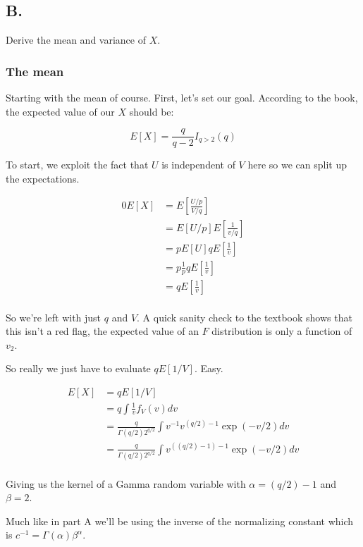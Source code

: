 \subsection*{B.}

Derive the mean and variance of $X$.

\subsubsection*{The mean}

Starting with the mean of course. First, let's set our goal. According to the book, the expected value of our $X$ should be:

$$E[X] = \frac{q}{q-2} I_{q > 2}(q)$$

To start, we exploit the fact that $U$ is independent of $V$ here so we can split up the expectations.

\vspace{-0.4cm}
\begin{align*}0
	E[X] &= E\left[ \frac{U/p}{V/q} \right] \\
	&= E[U/p] E\left[ \frac{1}{v/q} \right] \\
	&= pE[U] qE\left[ \frac{1}{v} \right] \\
	&= p\frac{1}{p}qE\left[ \frac{1}{v} \right] \\
	&= qE\left[ \frac{1}{v} \right] \\
\end{align*}

So we're left with just $q$ and $V$. A quick sanity check to the textbook shows that this isn't a red flag, the expected value of an $F$ distribution is only a function of $v_2$. 

So really we just have to evaluate $qE[1/V]$. Easy.

\begin{align*}
	E[X] &= qE[1/V] \\
	&= q \int \frac{1}{v} f_V(v) dv \\
	&= \frac{q}{\Gamma(q/2) 2^{q/2}} \int v^{-1} v^{(q/2)-1} \exp(-v/2) dv \\
	&= \frac{q}{\Gamma(q/2) 2^{q/2}} \int v^{((q/2) -1 )-1} \exp(-v/2) dv \\
\end{align*}

Giving us the kernel of a Gamma random variable with $\alpha = (q/2)-1$ and $\beta = 2$.

Much like in part A we'll be using the inverse of the normalizing constant which is $c^{-1} = \Gamma(\alpha)\beta^{\alpha}$.

